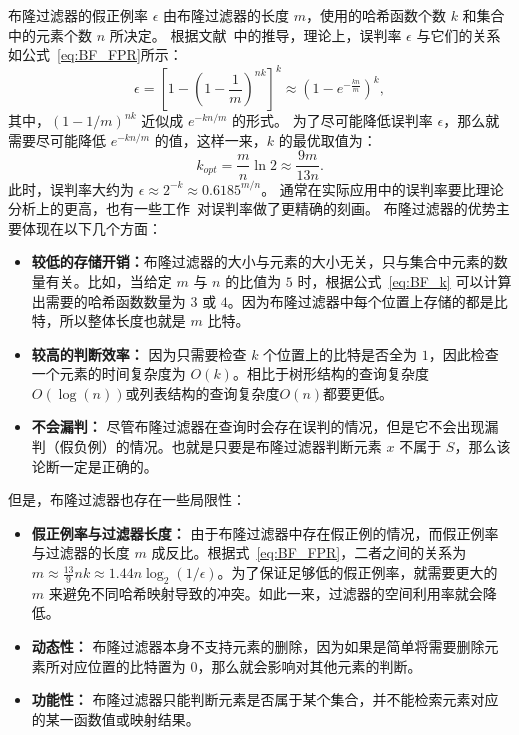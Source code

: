 布隆过滤器的假正例率 $\epsilon$ 由布隆过滤器的长度 $m$，使用的哈希函数个数 $k$ 和集合中的元素个数 $n$ 所决定。
根据文献~\cite{luo2019optimizing}中的推导，理论上，误判率 $\epsilon$ 与它们的关系如公式~\eqref{eq:BF_FPR}所示：
\begin{equation}
    \epsilon = \left[ 1 - \left( 1 - \frac{1}{m} \right)^{nk} \right]^k \approx \left(1 - e^{-\frac{kn}m{}}\right)^k,
    \label{eq:BF_FPR}
\end{equation}
其中，$(1-1/m)^{nk}$ 近似成 $e^{-kn/m}$ 的形式。
为了尽可能降低误判率 $\epsilon$，那么就需要尽可能降低 $e^{-kn/m}$ 的值，这样一来，$k$ 的最优取值为：
\begin{equation}
    k_{opt}= \frac{m}{n}\ln 2 \approx \frac{9m}{13n}.
    \label{eq:BF_k}
\end{equation}
此时，误判率大约为 $\epsilon \approx 2^{-k}\approx 0.6185^{m/n}$。
通常在实际应用中的误判率要比理论分析上的更高，也有一些工作~\cite{bose2008falsepositive,christensen2010new}对误判率做了更精确的刻画。
布隆过滤器的优势主要体现在以下几个方面：
\begin{itemize}
    \item \textbf{较低的存储开销：}布隆过滤器的大小与元素的大小无关，只与集合中元素的数量有关。比如，当给定 $m$ 与 $n$ 的比值为 $5$ 时，根据公式~\eqref{eq:BF_k} 可以计算出需要的哈希函数数量为 $3$ 或 $4$。因为布隆过滤器中每个位置上存储的都是比特，所以整体长度也就是 $m$ 比特。
    \item \textbf{较高的判断效率：} 因为只需要检查 $k$ 个位置上的比特是否全为 $1$，因此检查一个元素的时间复杂度为 $O(k)$。相比于树形结构的查询复杂度$O(\log(n))$或列表结构的查询复杂度$O(n)$都要更低。
    \item \textbf{不会漏判：} 尽管布隆过滤器在查询时会存在误判的情况，但是它不会出现漏判（假负例）的情况。也就是只要是布隆过滤器判断元素 $x$ 不属于 $S$，那么该论断一定是正确的。
\end{itemize}
但是，布隆过滤器也存在一些局限性：
\begin{itemize}
    \item \textbf{假正例率与过滤器长度：} 由于布隆过滤器中存在假正例的情况，而假正例率与过滤器的长度 $m$ 成反比。根据式~\ref{eq:BF_FPR}，二者之间的关系为 $m\approx \frac{13}{9}nk \approx 1.44n\log_2(1/\epsilon)$。为了保证足够低的假正例率，就需要更大的 $m$ 来避免不同哈希映射导致的冲突。如此一来，过滤器的空间利用率就会降低。
    \item \textbf{动态性：} 布隆过滤器本身不支持元素的删除，因为如果是简单将需要删除元素所对应位置的比特置为 $0$，那么就会影响对其他元素的判断。
    \item \textbf{功能性：} 布隆过滤器只能判断元素是否属于某个集合，并不能检索元素对应的某一函数值或映射结果。
\end{itemize}

